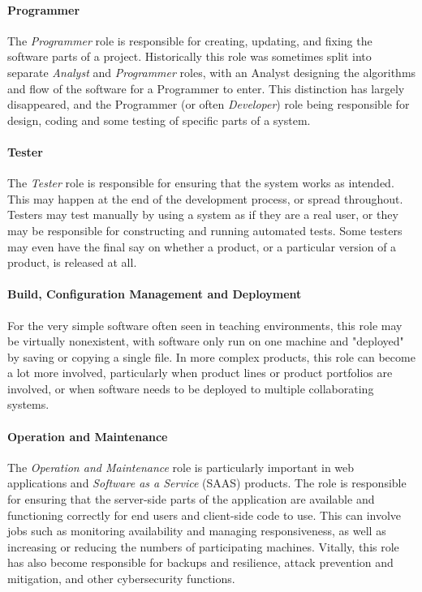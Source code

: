 \paragraph{Programmer}
The \emph{Programmer} role is responsible for creating, updating, and fixing the software parts of a project. Historically this role was sometimes split into separate \emph{Analyst} and \emph{Programmer} roles, with an Analyst designing the algorithms and flow of the software for a Programmer to enter. This distinction has largely disappeared, and the Programmer (or often \emph{Developer}) role being responsible for design, coding and some testing of specific parts of a system.

\paragraph{Tester}
The \emph{Tester} role is responsible for ensuring that the system works as intended. This may happen at the end of the development process, or spread throughout. Testers may test manually by using a system as if they are a real user, or they may be responsible for constructing and running automated tests. Some testers may even have the final say on whether a product, or a particular version of a product, is released at all.

\paragraph{Build, Configuration Management and Deployment}
For the very simple software often seen in teaching environments, this role may be virtually nonexistent, with software only run on one machine and "deployed" by saving or copying a single file. In more complex products, this role can become a lot more involved, particularly when product lines or product portfolios are involved, or when software needs to be deployed to multiple collaborating systems.

\paragraph{Operation and Maintenance}
The \emph{Operation and Maintenance} role is particularly important in web applications and \emph{Software as a Service} (SAAS) products. The role is responsible for ensuring that the server-side parts of the application are available and functioning correctly for end users and client-side code to use. This can involve jobs such as monitoring availability and managing responsiveness, as well as increasing or reducing the numbers of participating machines. Vitally, this role has also become responsible for backups and resilience, attack prevention and mitigation, and other cybersecurity functions.

